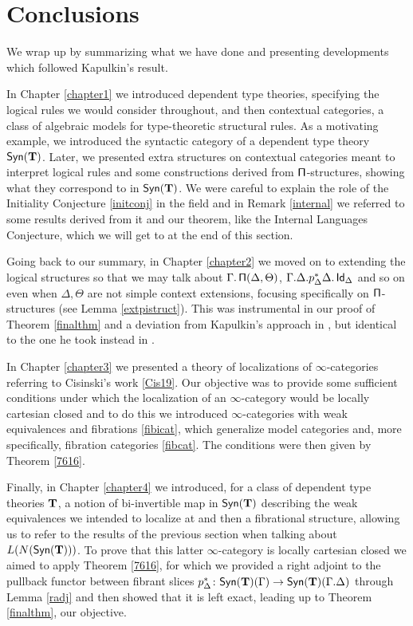 \section{Conclusions}

We wrap up by summarizing what we have done and presenting developments which
followed Kapulkin's result.

\noindent
In Chapter \ref{chapter1} we introduced dependent type theories, specifying the
logical rules we would consider throughout, and then contextual categories, a
class of algebraic models for type-theoretic structural rules. As a motivating
example, we introduced the syntactic category of a dependent type theory
$\mathsf{Syn}(\mathbf{T})$. Later, we presented extra structures on contextual categories meant
to interpret logical rules and some constructions derived from
$\operatorname{\mathsf{\Pi}}$-structures, showing what they correspond to in $\mathsf{Syn}(\mathbf{T})$. We were careful
to explain the role of the Initiality Conjecture \ref{initconj} in the field and
in Remark \ref{internal} we referred to some results derived from it and our
theorem, like the Internal Languages Conjecture, which we will get to at the end
of this section.

\noindent
Going back to our summary, in Chapter \ref{chapter2} we moved on to extending
the logical structures so that we may talk about $\Gamma.\operatorname{\mathsf{\Pi}}(\Delta,\Theta)$,
$\Gamma.\Delta.p^*_\Delta\Delta.\operatorname{\mathsf{Id}}_\Delta$ and so on even when $\Delta,\Theta$
are not simple context extensions, focusing specifically on $\operatorname{\mathsf{\Pi}}$-structures
(see Lemma \ref{extpistruct}). This was instrumental in our proof of Theorem
\ref{finalthm} and a deviation from Kapulkin's approach in \cite{Kap14}, but
identical to the one he took instead in \cite{Kap17}.

\noindent
In Chapter \ref{chapter3} we presented a theory of localizations of
$\infty$-categories referring to Cisinski's work \ref{Cis19}. Our objective was
to provide some sufficient conditions under which the localization of an
$\infty$-category would be locally cartesian closed and to do this we introduced
$\infty$-categories with weak equivalences and fibrations \ref{fibicat}, which
generalize model categories and, more specifically, fibration categories
\ref{fibcat}. The conditions were then given by Theorem \ref{7616}.

\noindent
Finally, in Chapter \ref{chapter4} we introduced, for a class of dependent type
theories $\operatorname{\mathbf{T}}$, a notion of bi-invertible map in $\mathsf{Syn}(\mathbf{T})$ describing the weak
equivalences we intended to localize at and then a fibrational structure,
allowing us to refer to the results of the previous section when talking about
$L(N(\mathsf{Syn}(\mathbf{T})))$. To prove that this latter $\infty$-category is locally
cartesian closed we aimed to apply Theorem \ref{7616}, for which
we provided a right adjoint to the pullback functor between fibrant
slices $p^*_\Delta\colon\mathsf{Syn}(\mathbf{T})(\Gamma)\rightarrow\mathsf{Syn}(\mathbf{T})(\Gamma.\Delta)$
through Lemma \ref{radj} and then showed that it is left exact, leading up to
Theorem \ref{finalthm}, our objective.

